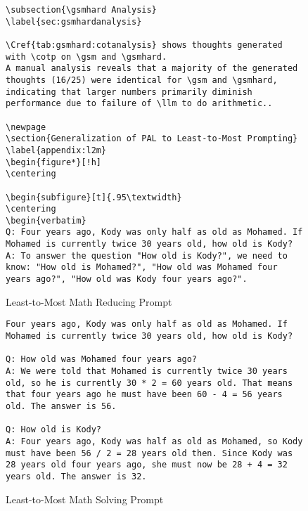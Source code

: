 \documentclass[dvipsnames]{article} \usepackage[accepted]{icml2022}
\newcommand{\cotp}{\textsc{CoT}\xspace}
\newcommand{\llm}{LLM\xspace}
\newcommand{\gsm}{\textsc{gsm8k}\xspace}
\newcommand{\gsmhard}{\textsc{gsm-hard}\xspace}
\begin{document}
\begin{figure*}[!ht]
\begin{subfigure}[t]{.95\textwidth}
\begin{verbatim}
\subsection{\gsmhard Analysis}
\label{sec:gsmhardanalysis}

\Cref{tab:gsmhard:cotanalysis} shows thoughts generated with \cotp on \gsm and \gsmhard.
A manual analysis reveals that a majority of the generated thoughts (16/25) were identical for \gsm and \gsmhard, indicating that larger numbers primarily diminish performance due to failure of \llm to do arithmetic..

\newpage
\section{Generalization of PAL to Least-to-Most Prompting}
\label{appendix:l2m}
\begin{figure*}[!h]
\centering

\begin{subfigure}[t]{.95\textwidth}
\centering
\begin{verbatim}
Q: Four years ago, Kody was only half as old as Mohamed. If Mohamed is currently twice 30 years old, how old is Kody?
A: To answer the question "How old is Kody?", we need to know: "How old is Mohamed?", "How old was Mohamed four years ago?", "How old was Kody four years ago?".
\end{verbatim}
\caption{Least-to-Most Math Reducing Prompt}
\end{subfigure}

\begin{subfigure}[t]{.95\textwidth}
\centering
\begin{verbatim}
Four years ago, Kody was only half as old as Mohamed. If Mohamed is currently twice 30 years old, how old is Kody?

Q: How old was Mohamed four years ago?
A: We were told that Mohamed is currently twice 30 years old, so he is currently 30 * 2 = 60 years old. That means that four years ago he must have been 60 - 4 = 56 years old. The answer is 56.

Q: How old is Kody?
A: Four years ago, Kody was half as old as Mohamed, so Kody must have been 56 / 2 = 28 years old then. Since Kody was 28 years old four years ago, she must now be 28 + 4 = 32 years old. The answer is 32.
\end{verbatim}
\caption{Least-to-Most Math Solving Prompt}
\end{subfigure}


\end{figure*}
\end{document}
